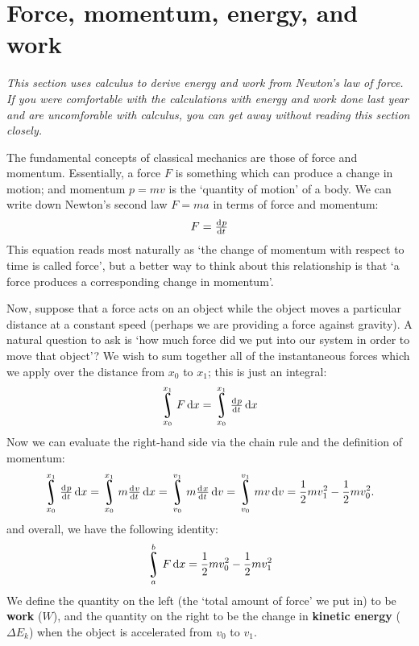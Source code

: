 \documentclass[a4paper]{amsbook}
\theoremstyle{definition}
\numberwithin{exercise}{chapter}
\numberwithin{exercise}{chapter}
\DeclareMathOperator*{\rint}{\scalerel*{\rotatebox{17}{$\!\int\!$}}{\int}}
\begin{document}
\section{Force, momentum, energy, and work}
\emph{This section uses calculus to derive energy and work from Newton's law of force. If you were comfortable with the
calculations with energy and work done last year and are uncomforable with calculus, you can get away without reading this
section closely.}

The fundamental concepts of classical mechanics are those of force and momentum. Essentially, a force $ F $ is something
which can produce a change in motion; and momentum $ p = mv $ is the `quantity of motion' of a body. We can write down Newton's
second law $ F = ma $ in terms of force and momentum:
\begin{equation}
  F = \od{p}{t}
\end{equation}
This equation reads most naturally as `the change of momentum with respect to time is called force', but a better way to think
about this relationship is that `a force produces a corresponding change in momentum'.

Now, suppose that a force acts on an object while the object moves a particular distance at a constant speed (perhaps we are
providing a force against gravity). A natural question to ask is `how much force did we put into our system in order to move
that object'? We wish to sum together all of the instantaneous forces which we apply over the distance from $ x_0 $ to $ x_1 $;
this is just an integral:
\begin{displaymath}
  \rint_{x_0}^{x_1} F \dif{x} = \rint_{x_0}^{x_1} \od{p}{t} \dif{x}
\end{displaymath}
Now we can evaluate the right-hand side via the chain rule and the definition of momentum:
\begin{displaymath}
  \rint_{x_0}^{x_1} \od{p}{t} \dif{x} = \rint_{x_0}^{x_1} m \od{v}{t} \dif{x} = \rint_{v_0}^{v_1} m \od{x}{t} \dif{v}
    = \rint_{v_0}^{v_1} mv \dif{v} = \frac{1}{2}mv_1^2 - \frac{1}{2}mv_0^2.
\end{displaymath}
and overall, we have the following identity:
\begin{displaymath}
  \rint_a^b F \dif{x} = \frac{1}{2}mv_0^2 - \frac{1}{2}mv_1^2
\end{displaymath}
We define the quantity on the left (the `total amount of force' we put in) to be \textbf{work} ($ W $), and the quantity on
the right to be the change in \textbf{kinetic energy} ($ \Delta E_k $) when the object is accelerated from $ v_0 $ to $ v_1 $.
\end{document}
